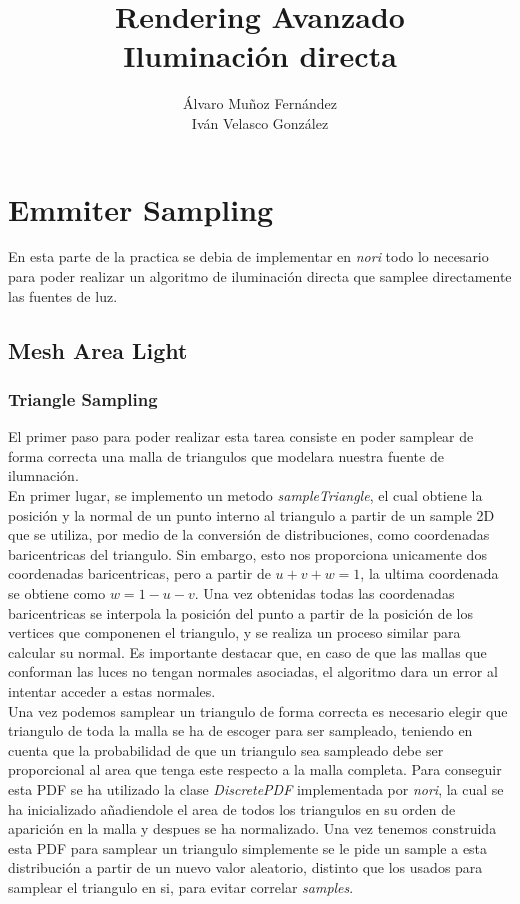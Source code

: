 \documentclass[10pt,oneside,a4paper]{article}
\begin{document}
\begin{titlepage}

\title{\Huge Rendering Avanzado  \\[0.7in] \LARGE Iluminación directa\\[3.6in]}
\date{}
\author{Álvaro Muñoz Fernández\\
Iván Velasco González}
\maketitle
\thispagestyle{empty}
\end{titlepage}

\section{Emmiter Sampling}
En esta parte de la practica se debia de implementar en \textit{nori} todo lo necesario para poder realizar un algoritmo de iluminación directa que samplee directamente las fuentes de luz.
\subsection{Mesh Area Light}
\subsubsection{Triangle Sampling}
El primer paso para poder realizar esta tarea consiste en poder samplear de forma correcta una malla de triangulos que modelara nuestra fuente de ilumnación.\\

En primer lugar, se implemento un metodo \textit{sampleTriangle}, el cual obtiene la posición y la normal de un punto interno al triangulo a partir de un sample 2D que se utiliza, por medio de la conversión de distribuciones, como coordenadas baricentricas del triangulo. Sin embargo, esto nos proporciona unicamente dos coordenadas baricentricas, pero a partir de $ u + v + w = 1$, la ultima coordenada se obtiene como $ w = 1 - u - v$. Una vez obtenidas todas las coordenadas baricentricas se interpola la posición del punto a partir de la posición de los vertices que componenen el triangulo, y se realiza un proceso similar para calcular su normal. Es importante destacar que, en caso de que las mallas que conforman las luces no tengan normales asociadas, el algoritmo dara un error al intentar acceder a estas normales.\\

Una vez podemos samplear un triangulo de forma correcta es necesario elegir que triangulo de toda la malla se ha de escoger para ser sampleado, teniendo en cuenta que la probabilidad de que un triangulo sea sampleado debe ser proporcional al area que tenga este respecto a la malla completa. Para conseguir esta PDF se ha utilizado la clase \textit{DiscretePDF} implementada por \textit{nori}, la cual se ha inicializado añadiendole el area de todos los triangulos en su orden de aparición en la malla y despues se ha normalizado. Una vez tenemos construida esta PDF para samplear un triangulo simplemente se le pide un sample a esta distribución a partir de un nuevo valor aleatorio, distinto que los usados para samplear el triangulo en si, para evitar correlar\textit{ samples}.
\end{document}

